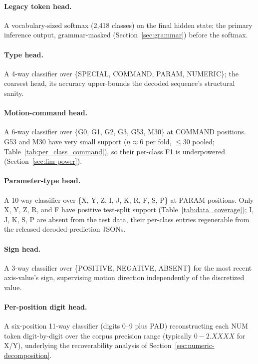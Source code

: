 \documentclass[sensors,article,submit,moreauthors,pdftex]{Definitions/mdpi}
\begin{document}
\paragraph{Legacy token head.} A vocabulary-sized softmax (2{,}418 classes) on the final hidden state; the primary inference output, grammar-masked (Section~\ref{sec:grammar}) before the softmax.

\paragraph{Type head.} A 4-way classifier over \{SPECIAL, COMMAND, PARAM, NUMERIC\}; the coarsest head, its accuracy upper-bounds the decoded sequence's structural sanity.

\paragraph{Motion-command head.} A 6-way classifier over \{G0, G1, G2, G3, G53, M30\} at COMMAND positions. G53 and M30 have very small support ($n\!\approx\!6$ per fold, $\le\!30$ pooled; Table~\ref{tab:per_class_command}), so their per-class F1 is underpowered (Section~\ref{sec:lim-power}).

\paragraph{Parameter-type head.} A 10-way classifier over \{X, Y, Z, I, J, K, R, F, S, P\} at PARAM positions. Only X, Y, Z, R, and F have positive test-split support (Table~\ref{tab:data_coverage}); I, J, K, S, P are absent from the test data, their per-class entries regenerable from the released decoded-prediction JSONs.

\paragraph{Sign head.} A 3-way classifier over \{POSITIVE, NEGATIVE, ABSENT\} for the most recent axis-value's sign, supervising motion direction independently of the discretized value.

\paragraph{Per-position digit head.} A six-position 11-way classifier (digits 0--9 plus PAD) reconstructing each NUM token digit-by-digit over the corpus precision range (typically $0\!-\!2\!.X\!X\!X\!X$ for X/Y), underlying the recoverability analysis of Section~\ref{sec:numeric-decomposition}.
\end{document}
